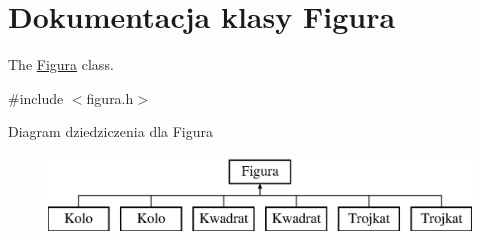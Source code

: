 \hypertarget{classFigura}{\section{Dokumentacja klasy Figura}
\label{classFigura}
}


The \hyperlink{classFigura}{Figura} class.  




{\ttfamily \#include $<$figura.\-h$>$}

Diagram dziedziczenia dla Figura\begin{figure}[H]
\begin{center}
\leavevmode
\includegraphics[height=2.000000cm]{d9/d07/classFigura}
\end{center}
\end{figure}
